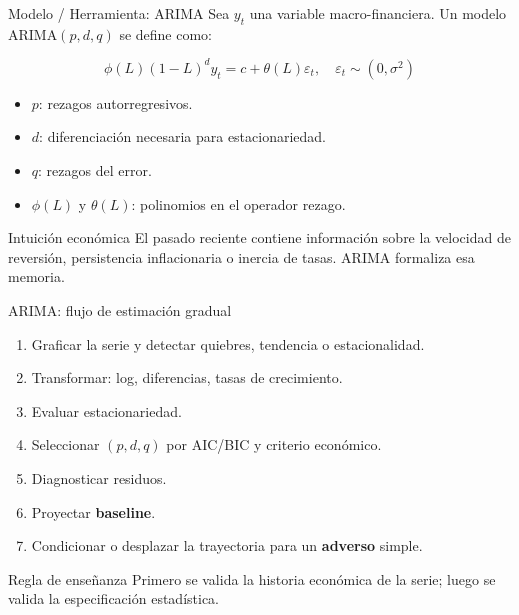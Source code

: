 \documentclass[10pt,aspectratio=169]{beamer}
\newcommand{\baseline}{\textcolor{MacropolTeal}{\textbf{baseline}}}
\newcommand{\adverso}{\textcolor{red!70!black}{\textbf{adverso}}}
\begin{document}
\begin{frame}{Modelo / Herramienta: ARIMA}
Sea $y_t$ una variable macro-financiera. Un modelo ARIMA$(p,d,q)$ se define como:

\[
\phi(L)(1-L)^d y_t = c + \theta(L)\varepsilon_t,
\quad \varepsilon_t \sim (0,\sigma^2)
\]

\begin{itemize}
  \item $p$: rezagos autorregresivos.
  \item $d$: diferenciación necesaria para estacionariedad.
  \item $q$: rezagos del error.
  \item $\phi(L)$ y $\theta(L)$: polinomios en el operador rezago.
\end{itemize}

\begin{block}{Intuición económica}
El pasado reciente contiene información sobre la velocidad de reversión, persistencia inflacionaria o inercia de tasas. ARIMA formaliza esa memoria.
\end{block}
\end{frame}

\begin{frame}{ARIMA: flujo de estimación gradual}
\begin{enumerate}
  \item Graficar la serie y detectar quiebres, tendencia o estacionalidad.
  \item Transformar: log, diferencias, tasas de crecimiento.
  \item Evaluar estacionariedad.
  \item Seleccionar $(p,d,q)$ por AIC/BIC y criterio económico.
  \item Diagnosticar residuos.
  \item Proyectar \baseline{}.
  \item Condicionar o desplazar la trayectoria para un \adverso{} simple.
\end{enumerate}

\vspace{0.4em}
\begin{block}{Regla de enseñanza}
Primero se valida la historia económica de la serie; luego se valida la especificación estadística.
\end{block}
\end{frame}
\end{document}
